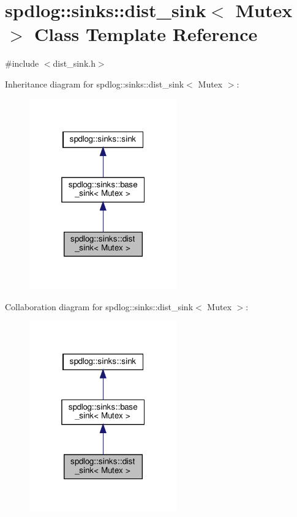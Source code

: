 \hypertarget{classspdlog_1_1sinks_1_1dist__sink}{}\section{spdlog\+:\+:sinks\+:\+:dist\+\_\+sink$<$ Mutex $>$ Class Template Reference}
\label{classspdlog_1_1sinks_1_1dist__sink}


{\ttfamily \#include $<$dist\+\_\+sink.\+h$>$}



Inheritance diagram for spdlog\+:\+:sinks\+:\+:dist\+\_\+sink$<$ Mutex $>$\+:
\nopagebreak
\begin{figure}[H]
\begin{center}
\leavevmode
\includegraphics[width=181pt]{classspdlog_1_1sinks_1_1dist__sink__inherit__graph}
\end{center}
\end{figure}


Collaboration diagram for spdlog\+:\+:sinks\+:\+:dist\+\_\+sink$<$ Mutex $>$\+:
\nopagebreak
\begin{figure}[H]
\begin{center}
\leavevmode
\includegraphics[width=181pt]{classspdlog_1_1sinks_1_1dist__sink__coll__graph}
\end{center}
\end{figure}
